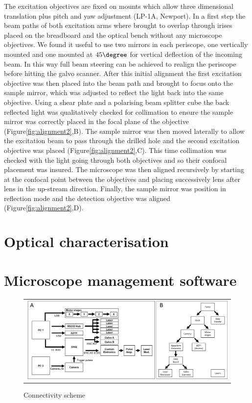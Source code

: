 \documentclass[12pt]{spieman}  %
\begin{document}
The excitation objectives are fixed on mounts which allow three dimensional translation plus pitch and yaw adjustment (LP-1A, Newport). In a first step the beam paths of both excitation arms where brought to overlap through irises placed on the breadboard and the optical bench without any microscope objectives. We found it useful to use two mirrors in each periscope, one vertically mounted and one mounted at $45\degree$ for vertical deflection of the incoming beam. In this way full beam steering can be achieved to realign the periscope before hitting the galvo scanner. After this initial alignment the first excitation objective was then placed into the beam path and brought to focus onto the sample mirror, which was adjusted to reflect the light back into the same objective. Using a shear plate and a polarising beam splitter cube the back reflected light was qualitatively checked for collimation to ensure the sample mirror was correctly placed in the focal plane of the objective (Figure\ref{fig:alignment2},B). The sample mirror was then moved laterally to allow the excitation beam to pass through the drilled hole and the second excitation objective was placed (Figure\ref{fig:alignment2},C). This time collimation was checked with the light going through both objectives and so their confocal placement was insured. The microscope was then aligned recursively by starting at the confocal point between the objectives and placing successively lens after lens in the up-stream direction. Finally, the sample mirror was position in reflection mode and the detection objective was aligned (Figure\ref{fig:alignment2},D). 

\section{Optical characterisation}
	
\section{Microscope management software}

	\begin{figure}
   \begin{center}
   \begin{tabular}{c}
   \includegraphics[width=\textwidth]{connectivity.eps}
   \end{tabular}
   \end{center}
   \caption{\label{fig:connectivity} Connectivity scheme} 
   \end{figure}
\end{document}
